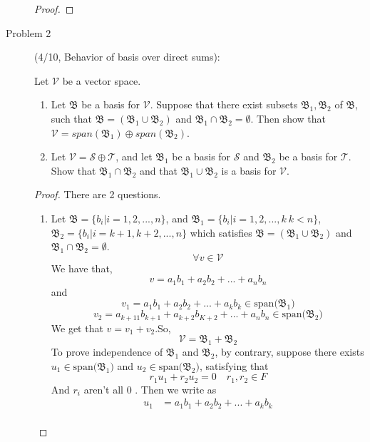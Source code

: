 \documentclass[a4paper]{article}
\begin{document}
\begin{description}
\begin{proof}
 \end{proof}

 \item[Problem 2](4/10, Behavior of basis over direct sums):{

       Let $\mathcal{V}$ be a vector space.
       \begin{enumerate}
        \item Let $\mathfrak{B}$ be a basis for $\mathcal{\mathcal{V}}$. Suppose that  there
              exist subsets $\mathfrak{B}_{1},\mathfrak{B}_2$ of $\mathfrak{B}$,
              such that $\mathfrak{B}=(\mathfrak{B}_{1}\cup\mathfrak{B}_{2})$ and
              $\mathfrak{B}_{1}\cap\mathfrak{B}_{2}=\emptyset$. Then show
              that $\mathcal{\mathcal{V}}=span(\mathfrak{B}_{1})\oplus span(\mathfrak{B}_{2})$.
        \item Let $\mathcal{\mathcal{V}}=\mathcal{S}\oplus\mathcal{T}$, and let $\mathfrak{B}_{1}$ be a basis for $\mathcal{S}$ and $\mathfrak{B}_{2}$ be a basis for $\mathcal{T}$.
              Show that $\mathfrak{B}_{1}\cap\mathfrak{B}_{2}$ and that $\mathfrak{B}_{1}\cup\mathfrak{B}_{2}$ is a basis for $\mathcal{V}$.
       \end{enumerate}
 }
 \begin{proof}
  There are 2 questions.
  \begin{enumerate}
   \item Let $\mathfrak{B}=\{b_{i} | i=1,2,...,n\}$, and
         $\mathfrak{B}_{1}=\{b_{i} | i=1,2,...,k\  k<n\}$,$\mathfrak{B}_{2}=\{b_{i}| i=k+1,k+2,...,n\}$
         which satisfies
         $\mathfrak{B}=(\mathfrak{B}_{1}\cup\mathfrak{B}_{2})$ and
         $\mathfrak{B}_{1}\cap\mathfrak{B}_{2}=\emptyset$.
         $$\forall  v  \in   \mathcal{V}$$
         We have that,
         $$v=a_{1}b_{1}+a_{2}b_{2}+...+a_{n}b_{n}$$
         and
         $$v_{1}=a_{1}b_{1}+a_{2}b_{2}+...+a_{k}b_{k} \in \text{span($\mathfrak{B}_{1}$)}$$
         $$v_{2}=a_{k+11}b_{k+1}+a_{k+2}b_{K+2}+...+a_{n}b_{n} \in \text{span($\mathfrak{B}_{2}$)}$$
         We get that $v=v_{1}+v_{2}$.So, $$\mathcal{V}=\mathfrak{B}_{1}+\mathfrak{B}_{2}$$
         To prove independence of $\mathfrak{B}_{1}$ and $\mathfrak{B}_{2}$,
         by contrary, suppose there exists $u_{1}\in \text{span($\mathfrak{B}_{1}$)}$ and
         $u_{2}\in \text{span($\mathfrak{B}_{2}$)}$, satisfying that
         $$r_{1}u_{1}+r_{2}u_{2}=0\quad r_{1},r_{2}\in F$$
         And $r_{i}$ aren't all $0$ . Then we write as
         \begin{align*}
          u_{1}                           & =a_{1}b_{1}+a_{2}b_{2}+...+a_{k}b_{k}                     \\

\end{align*}
\end{enumerate}
\end{proof}
\end{description}
\end{document}
